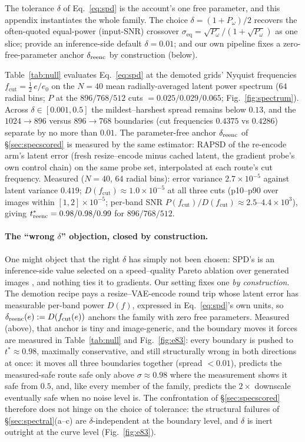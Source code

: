 The tolerance $\delta$ of Eq.~\ref{eq:spd} is the account's one free
parameter, and this appendix instantiates the whole family. The choice
$\delta = (1+P_\omega)/2$ recovers the often-quoted equal-power
(input-SNR) crossover
$\sigma_{\mathrm{eq}} = \sqrt{P_\omega}/(1+\sqrt{P_\omega})$ as one
slice; \citet{xiao2026spd} provide an inference-side default
$\delta = 0.01$; and our own pipeline fixes a zero-free-parameter
anchor $\delta_{\mathrm{reenc}}$ by construction (below).

Table~\ref{tab:null} evaluates Eq.~\ref{eq:spd} at the demoted grids'
Nyquist frequencies $f_{\mathrm{cut}} = \tfrac{1}{2}\,e/e_0$ on the
$N{=}40$ mean radially-averaged latent power spectrum ($64$ radial
bins; $P$ at the $896/768/512$ cuts $= 0.025/0.029/0.065$;
Fig.~\ref{fig:spectrum}). Across
$\delta \in [0.001, 0.5]$ the mildest--harshest spread remains below
$0.13$, and the $1024{\to}896$ versus $896{\to}768$ boundaries (cut
frequencies $0.4375$ vs $0.4286$) separate by no more than $0.01$.
The parameter-free anchor $\delta_{\mathrm{reenc}}$ of \S\ref{sec:specscored} is
measured by the same estimator: RAPSD of the re-encode arm's latent error
(fresh resize--encode minus cached latent, the gradient probe's own
control chain) on the same probe set, interpolated at each route's cut
frequency. Measured ($N{=}40$, $64$ radial bins): error variance
$2.7\times10^{-5}$ against latent variance $0.419$;
$D(f_{\mathrm{cut}}) \approx 1.0\times10^{-5}$ at all three cuts
(p10--p90 over images within $[1, 2]\times10^{-5}$; per-band SNR
$P(f_{\mathrm{cut}})/D(f_{\mathrm{cut}}) \approx 2.5$--$4.4\times10^{3}$),
giving $t^{*}_{\mathrm{reenc}} = 0.98 / 0.98 / 0.99$ for $896/768/512$.

\paragraph{The ``wrong $\delta$'' objection, closed by construction.}
One might object that the right $\delta$ has simply not been chosen:
SPD's is an inference-side value selected on a speed--quality Pareto
ablation over generated images \citep{xiao2026spd}, and nothing ties it
to gradients. Our setting fixes one \emph{by construction}. The
demotion recipe pays a resize--VAE-encode round trip whose latent error
has measurable per-band power $D(f)$, expressed in
Eq.~\ref{eq:spd}'s own units, so $\delta_{\mathrm{reenc}}(e) :=
D(f_{\mathrm{cut}}(e))$ anchors the family with zero free parameters.
Measured (above), that anchor is tiny and image-generic, and the
boundary moves it forces are measured in Table~\ref{tab:null} and
Fig.~\ref{fig:e83}: every boundary is pushed to $t^{*} \approx 0.98$,
maximally conservative, and still structurally wrong in both
directions at once: it moves all three boundaries together (spread
$< 0.01$), predicts the measured-safe route safe only above
$\sigma \approx 0.98$ where the measurement shows it safe from $0.5$,
and, like every member of the family, predicts the $2\times$ downscale
eventually safe when no noise level is. The confrontation of
\S\ref{sec:specscored} therefore does not hinge on the choice of
tolerance: the structural failures of \S\ref{sec:spectral}(a--c) are
$\delta$-independent at the boundary level, and $\delta$ is inert
outright at the curve level (Fig.~\ref{fig:e83}).

